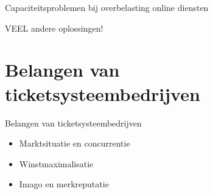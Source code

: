 \documentclass{beamer}
\begin{document}
\begin{frame}{Capaciteitsproblemen bij overbelasting online diensten}
    \begin{center}
        \alert{\Huge{VEEL andere oplossingen!}}
    \end{center}
\end{frame}


\section[Bedrijfsbelangen]{Belangen van ticketsysteembedrijven}
% 
% 
%   
\begin{frame}{Belangen van ticketsysteembedrijven}
    \begin{itemize}
        \item Marktsituatie en concurrentie
        \item Winstmaximalisatie
        \item Imago en merkreputatie
    \end{itemize}
\end{frame}
\end{document}
